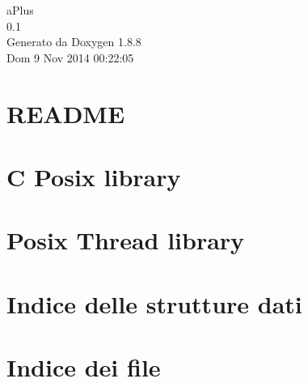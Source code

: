 \documentclass[twoside]{book}
\newcommand{\+}{\discretionary{\mbox{\scriptsize$\hookleftarrow$}}{}{}}
\newcommand{\clearemptydoublepage}{%
  \newpage{\pagestyle{empty}\cleardoublepage}%
}
\begin{document}
\hypersetup{pageanchor=false,
             bookmarks=true,
             bookmarksnumbered=true,
             pdfencoding=unicode
            }
\begin{titlepage}
\vspace*{7cm}
\begin{center}%
{\Large a\+Plus \\[1ex]\large 0.\+1 }\\
\vspace*{1cm}
{\large Generato da Doxygen 1.8.8}\\
\vspace*{0.5cm}
{\small Dom 9 Nov 2014 00:22:05}\\
\end{center}
\end{titlepage}
\clearemptydoublepage
\tableofcontents
\clearemptydoublepage
{}
\hypersetup{pageanchor=true}

\chapter{R\+E\+A\+D\+M\+E}
\label{md_README}
\hypertarget{md_README}{}

\chapter{C Posix library}
\label{md_usr_src_libposix_README}
\hypertarget{md_usr_src_libposix_README}{}

\chapter{Posix Thread library}
\label{md_usr_src_libpthread_README}
\hypertarget{md_usr_src_libpthread_README}{}

\chapter{Indice delle strutture dati}

\chapter{Indice dei file}

\end{document}
